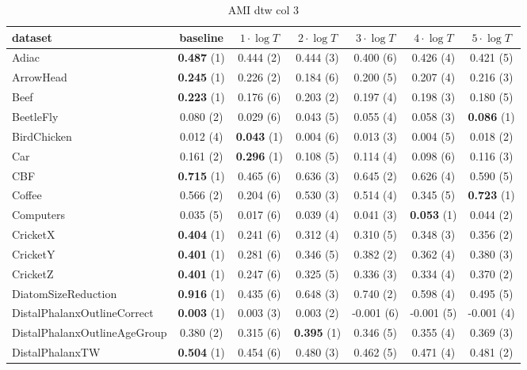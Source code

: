     \begin{table}[ht]
    \caption{AMI dtw col 3} 
    \begin{adjustbox}{width=\textwidth}
    \begin{tabular}{lcccccc}
    \hline
    dataset & baseline & \textbf{$1\cdot \log{T}$} & \textbf{$2\cdot \log{T}$} & \textbf{$3\cdot \log{T}$} & \textbf{$4\cdot \log{T}$} & \textbf{$5\cdot \log{T}$} \\ \hline
    Adiac & \textbf{0.487} (1) & 0.444 (2) & 0.444 (3) & 0.400 (6) & 0.426 (4) & 0.421 (5) \\
    ArrowHead & \textbf{0.245} (1) & 0.226 (2) & 0.184 (6) & 0.200 (5) & 0.207 (4) & 0.216 (3) \\
    Beef & \textbf{0.223} (1) & 0.176 (6) & 0.203 (2) & 0.197 (4) & 0.198 (3) & 0.180 (5) \\
    BeetleFly & 0.080 (2) & 0.029 (6) & 0.043 (5) & 0.055 (4) & 0.058 (3) & \textbf{0.086} (1) \\
    BirdChicken & 0.012 (4) & \textbf{0.043} (1) & 0.004 (6) & 0.013 (3) & 0.004 (5) & 0.018 (2) \\
    Car & 0.161 (2) & \textbf{0.296} (1) & 0.108 (5) & 0.114 (4) & 0.098 (6) & 0.116 (3) \\
    CBF & \textbf{0.715} (1) & 0.465 (6) & 0.636 (3) & 0.645 (2) & 0.626 (4) & 0.590 (5) \\
    Coffee & 0.566 (2) & 0.204 (6) & 0.530 (3) & 0.514 (4) & 0.345 (5) & \textbf{0.723} (1) \\
    Computers & 0.035 (5) & 0.017 (6) & 0.039 (4) & 0.041 (3) & \textbf{0.053} (1) & 0.044 (2) \\
    CricketX & \textbf{0.404} (1) & 0.241 (6) & 0.312 (4) & 0.310 (5) & 0.348 (3) & 0.356 (2) \\
    CricketY & \textbf{0.401} (1) & 0.281 (6) & 0.346 (5) & 0.382 (2) & 0.362 (4) & 0.380 (3) \\
    CricketZ & \textbf{0.401} (1) & 0.247 (6) & 0.325 (5) & 0.336 (3) & 0.334 (4) & 0.370 (2) \\
    DiatomSizeReduction & \textbf{0.916} (1) & 0.435 (6) & 0.648 (3) & 0.740 (2) & 0.598 (4) & 0.495 (5) \\
    DistalPhalanxOutlineCorrect & \textbf{0.003} (1) & 0.003 (3) & 0.003 (2) & -0.001 (6) & -0.001 (5) & -0.001 (4) \\
    DistalPhalanxOutlineAgeGroup & 0.380 (2) & 0.315 (6) & \textbf{0.395} (1) & 0.346 (5) & 0.355 (4) & 0.369 (3) \\
    DistalPhalanxTW & \textbf{0.504} (1) & 0.454 (6) & 0.480 (3) & 0.462 (5) & 0.471 (4) & 0.481 (2) \\

\end{tabular}
\end{adjustbox}
\end{table}
